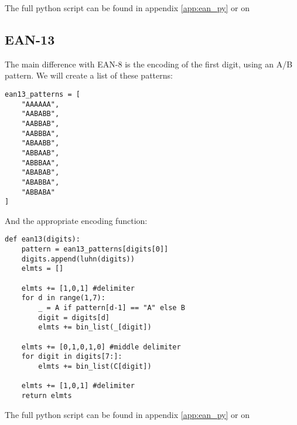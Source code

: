The full python script can be found in appendix \ref{app:ean_py} or on 

\subsection{EAN-13}
\label{ssec:ean13_py}

The main difference with EAN-8 is the encoding of the first digit, using an A/B pattern. We will create a list of these patterns:

\begin{verbatim}
ean13_patterns = [
    "AAAAAA",
    "AABABB",
    "AABBAB",
    "AABBBA",
    "ABAABB",
    "ABBAAB",
    "ABBBAA",
    "ABABAB",
    "ABABBA",
    "ABBABA"
]
\end{verbatim}

And the appropriate encoding function:

\begin{verbatim}
def ean13(digits):
    pattern = ean13_patterns[digits[0]]
    digits.append(luhn(digits))
    elmts = []

    elmts += [1,0,1] #delimiter
    for d in range(1,7):
        _ = A if pattern[d-1] == "A" else B
        digit = digits[d]
        elmts += bin_list(_[digit])

    elmts += [0,1,0,1,0] #middle delimiter
    for digit in digits[7:]:
        elmts += bin_list(C[digit])

    elmts += [1,0,1] #delimiter
    return elmts
\end{verbatim}

The full python script can be found in appendix \ref{app:ean_py} or on 
